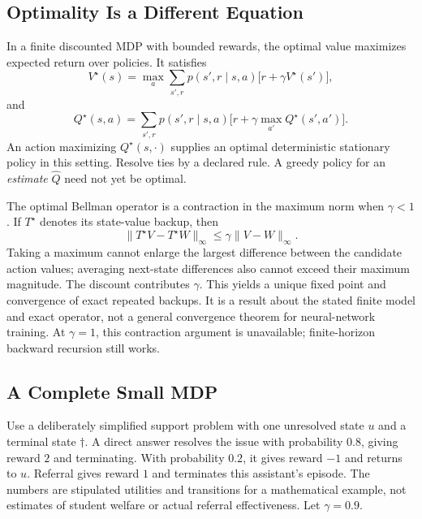 \subsection{Optimality Is a Different Equation}

In a finite discounted MDP with bounded rewards, the optimal value maximizes expected return over policies. It satisfies
\[
V^\star(s)=\max_a\sum_{s',r}p(s',r\mid s,a)
\bigl[r+\gamma V^\star(s')\bigr],
\]
and
\[
Q^\star(s,a)=\sum_{s',r}p(s',r\mid s,a)
\bigl[r+\gamma\max_{a'}Q^\star(s',a')\bigr].
\]
An action maximizing $Q^\star(s,\cdot)$ supplies an optimal deterministic stationary policy in this setting. Resolve ties by a declared rule. A greedy policy for an \emph{estimate} $\hat Q$ need not yet be optimal.

The optimal Bellman operator is a contraction in the maximum norm when $\gamma<1$. If $T^\star$ denotes its state-value backup, then
\[
\|T^\star V-T^\star W\|_\infty
\le\gamma\|V-W\|_\infty.
\]
Taking a maximum cannot enlarge the largest difference between the candidate action values; averaging next-state differences also cannot exceed their maximum magnitude. The discount contributes $\gamma$. This yields a unique fixed point and convergence of exact repeated backups. It is a result about the stated finite model and exact operator, not a general convergence theorem for neural-network training. At $\gamma=1$, this contraction argument is unavailable; finite-horizon backward recursion still works.

\subsection{A Complete Small MDP}

Use a deliberately simplified support problem with one unresolved state $u$ and a terminal state $\dagger$. A direct answer resolves the issue with probability $0.8$, giving reward $2$ and terminating. With probability $0.2$, it gives reward $-1$ and returns to $u$. Referral gives reward $1$ and terminates this assistant's episode. The numbers are stipulated utilities and transitions for a mathematical example, not estimates of student welfare or actual referral effectiveness. Let $\gamma=0.9$.

